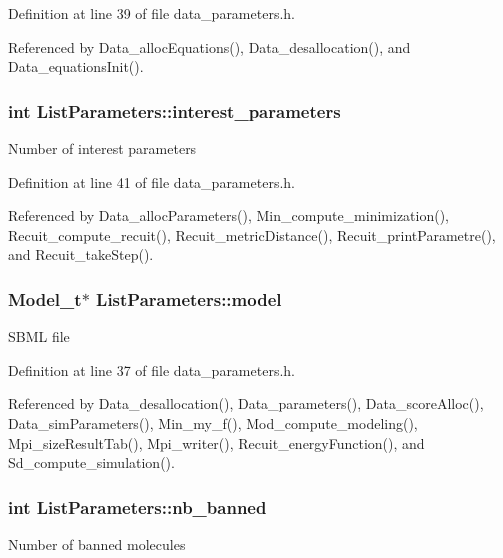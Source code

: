 Definition at line 39 of file data\_\-parameters.h.



Referenced by Data\_\-allocEquations(), Data\_\-desallocation(), and Data\_\-equationsInit().

\hypertarget{structListParameters_ae9a1f821ed712556e68fe4d2d91ca1a0}{
\subsubsection[{interest\_\-parameters}]{\setlength{\rightskip}{0pt plus 5cm}int {\bf ListParameters::interest\_\-parameters}}}
\label{structListParameters_ae9a1f821ed712556e68fe4d2d91ca1a0}
Number of interest parameters 

Definition at line 41 of file data\_\-parameters.h.



Referenced by Data\_\-allocParameters(), Min\_\-compute\_\-minimization(), Recuit\_\-compute\_\-recuit(), Recuit\_\-metricDistance(), Recuit\_\-printParametre(), and Recuit\_\-takeStep().

\hypertarget{structListParameters_ad167c56ffa16ae7c55245c7c683bbc1c}{
\subsubsection[{model}]{\setlength{\rightskip}{0pt plus 5cm}Model\_\-t$\ast$ {\bf ListParameters::model}}}
\label{structListParameters_ad167c56ffa16ae7c55245c7c683bbc1c}
SBML file 

Definition at line 37 of file data\_\-parameters.h.



Referenced by Data\_\-desallocation(), Data\_\-parameters(), Data\_\-scoreAlloc(), Data\_\-simParameters(), Min\_\-my\_\-f(), Mod\_\-compute\_\-modeling(), Mpi\_\-sizeResultTab(), Mpi\_\-writer(), Recuit\_\-energyFunction(), and Sd\_\-compute\_\-simulation().

\hypertarget{structListParameters_aae885063019b7630081d14786e3b48e9}{
\subsubsection[{nb\_\-banned}]{\setlength{\rightskip}{0pt plus 5cm}int {\bf ListParameters::nb\_\-banned}}}
\label{structListParameters_aae885063019b7630081d14786e3b48e9}
Number of banned molecules 

